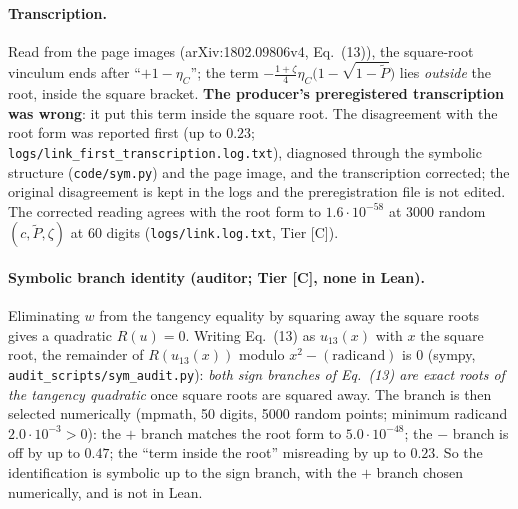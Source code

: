 \documentclass[10pt]{article}
\newcommand{\tier}[1]{\textsf{[#1]}}
\newcommand{\tC}{\tier{C}}
\newcommand{\eC}{\eta_C}
\theoremstyle{plain}
\begin{document}
\paragraph{Transcription.} Read from the page images (arXiv:1802.09806v4, Eq.~(13)), the square-root vinculum ends after ``$+1-\eC$''; the term $-\tfrac{1+\zeta}{4}\eC\bigl(1-\sqrt{1-\tilde P}\bigr)$ lies \emph{outside} the root, inside the square bracket. \textbf{The producer's preregistered transcription was wrong}: it put this term inside the square root. The disagreement with the root form was reported first (up to $0.23$; \texttt{logs/link\_first\_transcription.log.txt}), diagnosed through the symbolic structure (\texttt{code/sym.py}) and the page image, and the transcription corrected; the original disagreement is kept in the logs and the preregistration file is not edited. The corrected reading agrees with the root form to $1.6\cdot10^{-58}$ at $3000$ random $(c,\tilde P,\zeta)$ at 60 digits (\texttt{logs/link.log.txt}, Tier \tC{}).
\paragraph{Symbolic branch identity (auditor; Tier \tC{}, none in Lean).} Eliminating $w$ from the tangency equality by squaring away the square roots gives a quadratic $R(u)=0$. Writing Eq.~(13) as $u_{13}(x)$ with $x$ the square root, the remainder of $R(u_{13}(x))$ modulo $x^2-(\text{radicand})$ is $0$ (sympy, \texttt{audit\_scripts/sym\_audit.py}): \emph{both sign branches of Eq.~(13) are exact roots of the tangency quadratic} once square roots are squared away. The branch is then selected numerically (mpmath, 50 digits, 5000 random points; minimum radicand $2.0\cdot10^{-3}>0$): the $+$ branch matches the root form to $5.0\cdot10^{-48}$; the $-$ branch is off by up to $0.47$; the ``term inside the root'' misreading by up to $0.23$. So the identification is symbolic up to the sign branch, with the $+$ branch chosen numerically, and is not in Lean.
\end{document}
